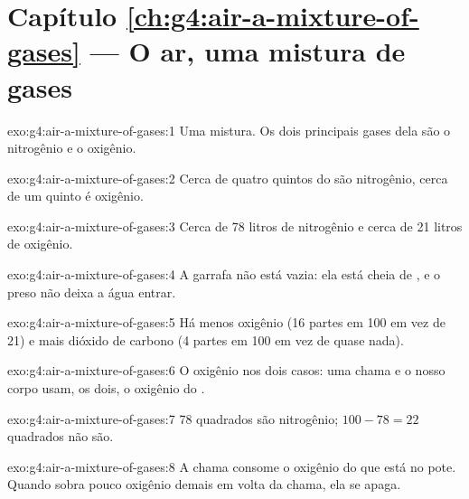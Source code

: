 \section*{Capítulo \ref{ch:g4:air-a-mixture-of-gases} --- O ar, uma mistura de gases}

\begin{solution}{exo:g4:air-a-mixture-of-gases:1}
Uma mistura. Os dois principais gases dela são o nitrogênio e o oxigênio.
\end{solution}

\begin{solution}{exo:g4:air-a-mixture-of-gases:2}
Cerca de quatro quintos do  são nitrogênio, cerca de um quinto é oxigênio.
\end{solution}

\begin{solution}{exo:g4:air-a-mixture-of-gases:3}
Cerca de 78 litros de nitrogênio e cerca de 21 litros de oxigênio.
\end{solution}

\begin{solution}{exo:g4:air-a-mixture-of-gases:4}
A garrafa não está vazia: ela está cheia de , e o  preso não deixa
a água entrar.
\end{solution}

\begin{solution}{exo:g4:air-a-mixture-of-gases:5}
Há menos oxigênio (16 partes em 100 em vez de 21) e mais dióxido de
carbono (4 partes em 100 em vez de quase nada).
\end{solution}

\begin{solution}{exo:g4:air-a-mixture-of-gases:6}
O oxigênio nos dois casos: uma chama e o nosso corpo usam, os dois, o
oxigênio do .
\end{solution}

\begin{solution}{exo:g4:air-a-mixture-of-gases:7}
78 quadrados são nitrogênio; $100 - 78 = 22$ quadrados não são.
\end{solution}

\begin{solution}{exo:g4:air-a-mixture-of-gases:8}
A chama consome o oxigênio do  que está no pote. Quando sobra pouco
oxigênio demais em volta da chama, ela se apaga.
\end{solution}

